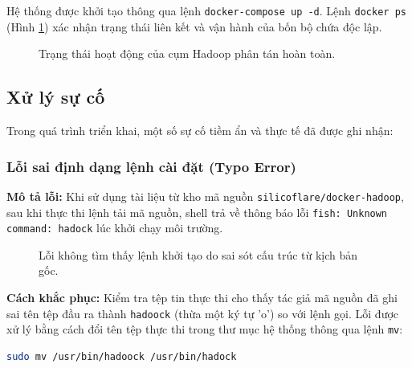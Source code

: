 Hệ thống được khởi tạo thông qua lệnh \texttt{docker-compose up -d}. Lệnh \texttt{docker ps} (Hình \ref{fig:fully_ps}) xác nhận trạng thái liên kết và vận hành của bốn bộ chứa độc lập.

\begin{figure}[H]
    \centering
    \caption{Trạng thái hoạt động của cụm Hadoop phân tán hoàn toàn.}
    \label{fig:fully_ps}
\end{figure}

\subsection{Xử lý sự cố}
Trong quá trình triển khai, một số sự cố tiềm ẩn và thực tế đã được ghi nhận:

\subsubsection{Lỗi sai định dạng lệnh cài đặt (Typo Error)}
\textbf{Mô tả lỗi:} Khi sử dụng tài liệu từ kho mã nguồn \texttt{silicoflare/docker-hadoop}, sau khi thực thi lệnh tải mã nguồn, shell trả về thông báo lỗi \texttt{fish: Unknown command: hadock} lúc khởi chạy môi trường.

\begin{figure}[H]
    \centering
    \caption{Lỗi không tìm thấy lệnh khởi tạo do sai sót cấu trúc từ kịch bản gốc.}
    \label{fig:typo_error}
\end{figure}

\textbf{Cách khắc phục:} Kiểm tra tệp tin thực thi cho thấy tác giả mã nguồn đã ghi sai tên tệp đầu ra thành \texttt{hadoock} (thừa một ký tự 'o') so với lệnh gọi. Lỗi được xử lý bằng cách đổi tên tệp thực thi trong thư mục hệ thống thông qua lệnh \texttt{mv}:
\begin{lstlisting}[language=bash, numbers=none]
sudo mv /usr/bin/hadoock /usr/bin/hadock
\end{lstlisting}

